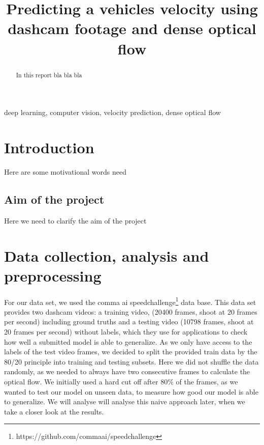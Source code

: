 \documentclass[conference]{IEEEtran}
\begin{document}
\title{Predicting a vehicles velocity using dashcam footage and dense optical flow}

\author{
\and
{}
}

\maketitle

\begin{abstract}
In this report bla bla bla
\end{abstract}

\begin{IEEEkeywords}
deep learning, computer vision, velocity prediction, dense optical flow
\end{IEEEkeywords}

\section{Introduction}
Here are some motivational words need
\subsection{Aim of the project}
Here we need to clarify the aim of the project
 

\section{Data collection, analysis and preprocessing}
For our data set, we used the comma ai speedchallenge\footnote{https://github.com/commaai/speedchallenge} data base. This data
set provides two dashcam videos: a training video, (20400 frames, shoot at 20 frames per second) including 
ground truths and a testing video (10798 frames, shoot at 20 frames per second) without labels, which they use for applications 
to check how well a submitted model is able to generalize.
As we only have access to the labels of the test video frames, we decided to split the provided train data by the 80/20 principle into 
training and testing subsets. Here we did not shuffle the data randomly, as we needed to always have two consecutive frames to 
calculate the optical flow. We initially used a hard cut off after 80$\%$ of the frames, as we wanted to test our model on unseen data, 
to measure how good our model is able to generalize. We will analyse will analyse this naive approach later, when we take a closer look
at the results.
\end{document}
